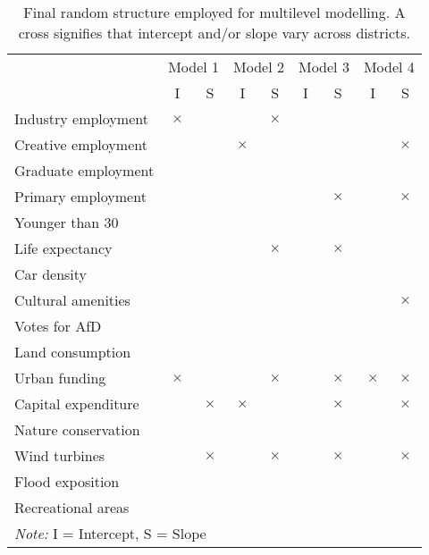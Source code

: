 \begin{table}

\caption[Final random structured employed for multilevel modelling]{\label{tab:random_structure}Final random structure employed for multilevel modelling. A cross signifies that intercept and/or slope vary across districts.}
\centering
\begin{tabular}[t]{>{}l|c>{}c|c>{}c|c>{}c|c>{}c|}
\toprule
\multicolumn{1}{c}{ } & \multicolumn{2}{c}{Model 1} & \multicolumn{2}{c}{Model 2} & \multicolumn{2}{c}{Model 3} & \multicolumn{2}{c}{Model 4} \\
\cmidrule(l{3pt}r{3pt}){2-3} \cmidrule(l{3pt}r{3pt}){4-5} \cmidrule(l{3pt}r{3pt}){6-7} \cmidrule(l{3pt}r{3pt}){8-9}
 & I & S & I & S & I & S & I & S\\
\midrule
Industry employment & $\times$ &  &  & $\times$ &  &  &  & \\
Creative employment &  &  & $\times$ &  &  &  &  & $\times$\\
Graduate employment &  &  &  &  &  &  &  & \\
Primary employment &  &  &  &  &  & $\times$ &  & $\times$\\
Younger than 30 &  &  &  &  &  &  &  & \\
Life expectancy &  &  &  & $\times$ &  & $\times$ &  & \\
Car density &  &  &  &  &  &  &  & \\
Cultural amenities &  &  &  &  &  &  &  & $\times$\\
Votes for AfD &  &  &  &  &  &  &  & \\
Land consumption &  &  &  &  &  &  &  & \\
Urban funding & $\times$ &  &  & $\times$ &  & $\times$ & $\times$ & $\times$\\
Capital expenditure &  & $\times$ & $\times$ &  &  & $\times$ &  & $\times$\\
Nature conservation &  &  &  &  &  &  &  & \\
Wind turbines &  & $\times$ &  & $\times$ &  & $\times$ &  & $\times$\\
Flood exposition &  &  &  &  &  &  &  & \\
Recreational areas &  &  &  &  &  &  &  & \\
\bottomrule
\multicolumn{9}{l}{\rule{0pt}{1em}\textit{Note: } I = Intercept, S = Slope}\\
\end{tabular}
\end{table}